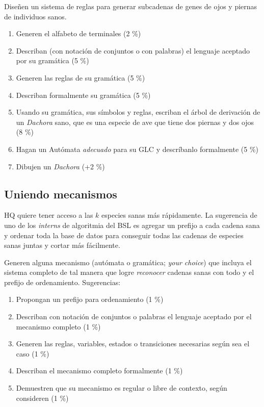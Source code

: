 \documentclass[8pt, onside]{article}
\begin{document}
Diseñen un sistema de reglas para generar subcadenas de genes de ojos y piernas de individuos sanos.

\begin{enumerate}[label=\tt \alph*)]
    \item Generen el alfabeto de terminales (2 \%)
    \item Describan (con notación de conjuntos o con palabras) el lenguaje aceptado por su gramática (5 \%)
    \item Generen las reglas de su gramática (5 \%)
    \item Describan formalmente su gramática (5 \%)
    \item Usando su gramática, sus símbolos y reglas, escriban el árbol de derivación de un \textit{Dachora} sano, que es una especie de ave que tiene dos piernas y dos ojos (8 \%)
    \item Hagan un Autómata \textit{adecuado} para su GLC y descríbanlo formalmente (5 \%)
    \item Dibujen un \textit{Dachora} (+2 \%)
    
\end{enumerate}

\subsection*{Uniendo mecanismos}

HQ quiere tener acceso a las $k$ especies sanas más rápidamente.
La sugerencia de uno de los \textit{interns} de algoritmia del BSL es agregar un prefijo a cada cadena sana y ordenar toda la base de datos para conseguir todas las cadenas de especies sanas juntas y cortar más fácilmente.

Generen alguna mecanismo (autómata o gramática; \textit{your choice}) que incluya el sistema completo de tal manera que logre \textit{reconocer} cadenas sanas con todo y el prefijo de ordenamiento. Sugerencias:

\begin{enumerate}[label=\tt \alph*)]
    \item Propongan un prefijo para ordenamiento (1 \%)
    \item Describan con notación de conjuntos o palabras el lenguaje aceptado por el mecanismo completo (1 \%)
    \item Generen las reglas, variables, estados o transiciones necesarias según sea el caso (1 \%)
    \item Describan el mecanismo completo formalmente (1 \%)
    \item Demuestren que su mecanismo es regular o libre de contexto, según consideren (1 \%)
\end{enumerate}
\end{document}
